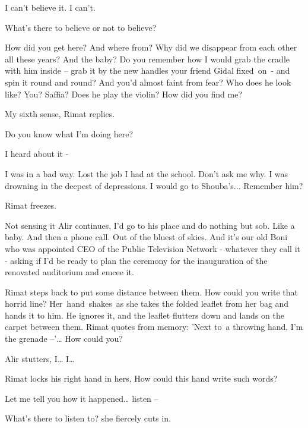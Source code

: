\documentclass[letterpaper]{article}
\begin{document}
{\textquotedbl}I can't believe it. I can't.{\textquotedbl} 

{\textquotedbl}What's there to believe or not to believe?{\textquotedbl} 

{\textquotedbl}How did you get here? And where from? Why did we disappear from each other all these years? And the baby?
Do you remember how I would grab the cradle with him inside -- grab it by the new handles your friend Gidal
fixed\textcolor[rgb]{0.8901961,0.42352942,0.039215688}{\ }on\textcolor[rgb]{0.8901961,0.42352942,0.039215688}{\ }{}-
and spin it round and round? And you'd almost faint from fear? Who does he look like? You? Saffia? Does he play the
violin? How did you find me?{\textquotedbl}\ 

{\textquotedbl}My sixth sense,{\textquotedbl} Rimat replies. 

{\textquotedbl}Do you know what I'm doing here?{\textquotedbl} 

{\textquotedbl}I heard about it -{\textquotedbl}

{\textquotedbl}I was in a bad way. Lost the job I had at the school. Don't ask me why. I was drowning in the deepest of
depressions. I would go to Shouba's... Remember him?{\textquotedbl}

Rimat freezes.

Not sensing it Alir continues, {\textquotedbl}I'd go to his place and do nothing but sob. Like a baby. And then a phone
call. Out of the bluest of skies. And it's our old Boni who was appointed CEO of the Public Television Network -
whatever they call it - asking if I'd be ready to plan the ceremony for the inauguration of the renovated auditorium
and emcee it.{\textquotedbl} 

Rimat steps back to put some distance between them. {\textquotedbl}How could you write that horrid line?{\textquotedbl}
Her\ hand\ shakes\ as she takes the folded leaflet from her bag and hands it to him. He ignores it, and the leaflet
flutters down and lands on the carpet between them. Rimat quotes from memory: {\textquotedbl}'Next to~a throwing hand,
I'm the grenade --'{\dots} How could you?{\textquotedbl} 

Alir stutters, {\textquotedbl}I{\dots} I{\dots}{\textquotedbl} 

Rimat locks his right hand in hers, {\textquotedbl}How could this hand write such words?{\textquotedbl} 

{\textquotedbl}Let me tell you how it happened{\dots} listen -- {\textquotedbl} 

{\textquotedbl}What's there to listen to?{\textquotedbl} she fiercely cuts in.
\end{document}
